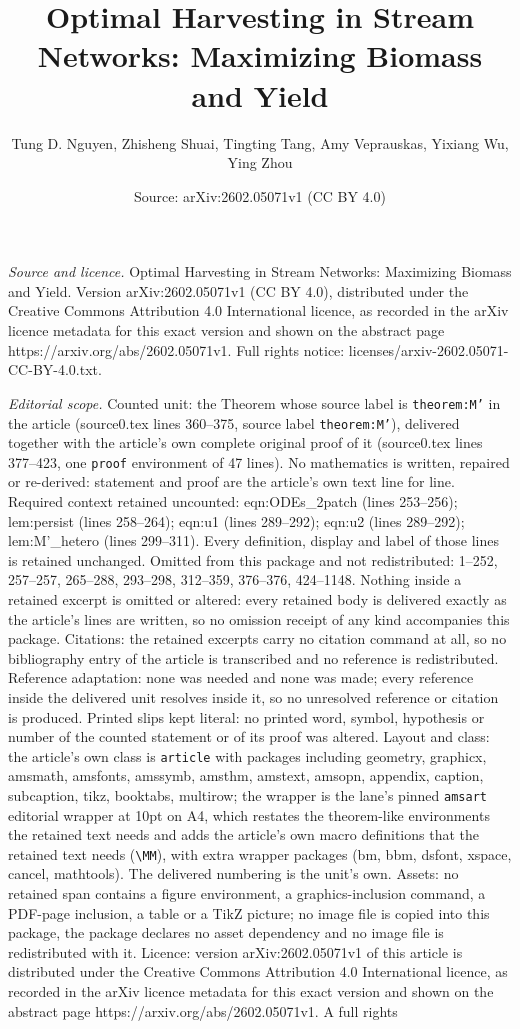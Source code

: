 \documentclass[10pt,a4paper]{amsart}
\title[Optimal Harvesting in Stream Networks: Maximizing Biomass an]{Optimal Harvesting in Stream Networks: Maximizing Biomass and Yield}
\author{Tung D. Nguyen, Zhisheng Shuai, Tingting Tang, Amy Veprauskas, Yixiang Wu, Ying Zhou}
\date{Source: arXiv:2602.05071v1 (CC BY 4.0)}
\begin{document}
\maketitle

\noindent\emph{Source and licence.} Optimal Harvesting in Stream Networks: Maximizing Biomass and Yield. Version arXiv:2602.05071v1 (CC BY 4.0), distributed under the Creative Commons Attribution 4.0 International licence, as recorded in the arXiv licence metadata for this exact version and shown on the abstract page https://arxiv.org/abs/2602.05071v1. Full rights notice: licenses/arxiv-2602.05071-CC-BY-4.0.txt.\par\smallskip

\noindent\textit{Editorial scope.} Counted unit: the Theorem whose source label is \texttt{theorem:M'} in the article (source0.tex lines 360--375, source label \texttt{theorem:M'}), delivered together with the article's own complete original proof of it (source0.tex lines 377--423, one \texttt{proof} environment of 47 lines). No mathematics is written, repaired or re-derived: statement and proof are the article's own text line for line. Required context retained uncounted: eqn:ODEs\_2patch (lines 253--256); lem:persist (lines 258--264); eqn:u1 (lines 289--292); eqn:u2 (lines 289--292); lem:M'\_hetero (lines 299--311). Every definition, display and label of those lines is retained unchanged. Omitted from this package and not redistributed: 1--252, 257--257, 265--288, 293--298, 312--359, 376--376, 424--1148. Nothing inside a retained excerpt is omitted or altered: every retained body is delivered exactly as the article's lines are written, so no omission receipt of any kind accompanies this package. Citations: the retained excerpts carry no citation command at all, so no bibliography entry of the article is transcribed and no reference is redistributed. Reference adaptation: none was needed and none was made; every reference inside the delivered unit resolves inside it, so no unresolved reference or citation is produced. Printed slips kept literal: no printed word, symbol, hypothesis or number of the counted statement or of its proof was altered. Layout and class: the article's own class is \texttt{article} with packages including geometry, graphicx, amsmath, amsfonts, amssymb, amsthm, amstext, amsopn, appendix, caption, subcaption, tikz, booktabs, multirow; the wrapper is the lane's pinned \texttt{amsart} editorial wrapper at 10pt on A4, which restates the theorem-like environments the retained text needs and adds the article's own macro definitions that the retained text needs (\texttt{\textbackslash MM}), with extra wrapper packages (bm, bbm, dsfont, xspace, cancel, mathtools). The delivered numbering is the unit's own. Assets: no retained span contains a figure environment, a graphics-inclusion command, a PDF-page inclusion, a table or a TikZ picture; no image file is copied into this package, the package declares no asset dependency and no image file is redistributed with it. Licence: version arXiv:2602.05071v1 of this article is distributed under the Creative Commons Attribution 4.0 International licence, as recorded in the arXiv licence metadata for this exact version and shown on the abstract page https://arxiv.org/abs/2602.05071v1. A full rights 
\end{document}
